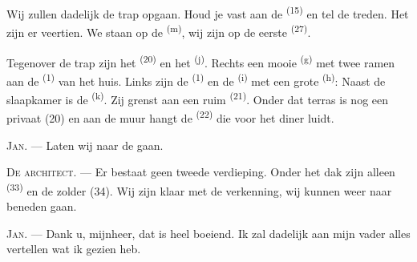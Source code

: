 Wij zullen dadelijk de trap opgaan. Houd je vast aan de 
\textsuperscript{(15)} en tel de treden. Het zijn er veertien. We staan op de
 \textsuperscript{(m)}, wij zijn op de eerste
 \textsuperscript{(27)}.

\VUsaut{3.0mm}
\VUsaut{3.0mm}

Tegenover de trap zijn het  \textsuperscript{(20)} en het
 \textsuperscript{(j)}. Rechts een mooie
 \textsuperscript{(g)} met twee ramen aan de 
\textsuperscript{(1)} van het huis. Links zijn de  \textsuperscript{(1)} en
de  \textsuperscript{(i)} met een grote 
\textsuperscript{(h)}: Naast de slaapkamer is de
 \textsuperscript{(k)}. Zij grenst aan een ruim
 \textsuperscript{(21)}. Onder dat terras is nog een privaat (20)
en aan de muur hangt de  \textsuperscript{(22)} die voor het diner luidt.

\textsc{Jan}. --- Laten wij naar de  gaan.

\textsc{De architect}. --- Er bestaat geen tweede verdieping. Onder het dak zijn alleen
 \textsuperscript{(33)} en de zolder (34). Wij zijn klaar met de
verkenning, wij kunnen weer naar beneden gaan.

\textsc{Jan}. --- Dank u, mijnheer, dat is heel boeiend. Ik zal dadelijk aan mijn vader alles
vertellen wat ik gezien heb.
\VUsaut{4.0mm}
\VUfilet{22mm}
